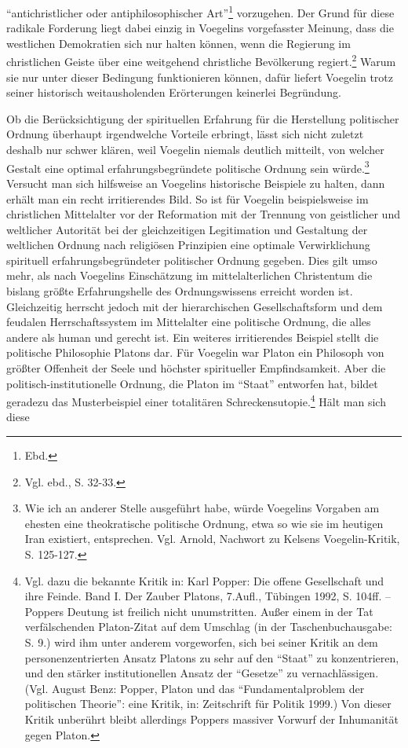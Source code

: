 "`antichristlicher oder antiphilosophischer Art"'\footnote{Ebd.} vorzugehen.
Der Grund für diese radikale Forderung liegt dabei einzig in Voegelins
vorgefasster Meinung, dass die westlichen Demokratien sich nur halten können,
wenn die Regierung im christlichen Geiste über eine weitgehend christliche
Bevölkerung regiert.\footnote{Vgl. ebd., S.  32-33.}  Warum sie nur unter
dieser Bedingung funktionieren können, dafür liefert Voegelin trotz seiner
historisch weitausholenden Erörterungen keinerlei Begründung.

Ob die Berücksichtigung der spirituellen Erfahrung für die Herstellung
politischer Ordnung überhaupt irgendwelche Vorteile erbringt, lässt sich nicht
zuletzt deshalb nur schwer klären, weil Voegelin niemals deutlich mitteilt,
von welcher Gestalt eine optimal erfahrungsbegründete politische Ordnung sein
würde.\footnote{Wie ich an anderer Stelle ausgeführt habe, würde Voegelins
  Vorgaben am ehesten eine theokratische politische Ordnung, etwa so wie sie
  im heutigen Iran existiert, entsprechen. Vgl. Arnold, Nachwort zu Kelsens
  Voegelin-Kritik, S. 125-127.}  Versucht man sich hilfsweise an Voegelins
historische Beispiele zu halten, dann erhält man ein recht irritierendes Bild.
So ist für Voegelin beispielsweise im christlichen Mittelalter vor der
Reformation mit der Trennung von geistlicher und weltlicher Autorität bei der
gleichzeitigen Legitimation und Gestaltung der weltlichen Ordnung nach
religiösen Prinzipien eine optimale Verwirklichung spirituell
erfahrungsbegründeter politischer Ordnung gegeben. Dies gilt umso mehr, als
nach Voegelins Einschätzung im mittelalterlichen Christentum die bislang
größte Erfahrungshelle des Ordnungswissens erreicht worden ist.  Gleichzeitig
herrscht jedoch mit der hierarchischen Gesellschaftsform und dem feudalen
Herrschaftssystem im Mittelalter eine politische Ordnung, die alles andere als
human und gerecht ist. Ein weiteres irritierendes Beispiel stellt die
politische Philosophie Platons dar. Für Voegelin war Platon ein Philosoph von
größter Offenheit der Seele und höchster spiritueller Empfindsamkeit. Aber die
politisch-institutionelle Ordnung, die Platon im "`Staat"' entworfen hat,
bildet geradezu das Musterbeispiel einer totalitären
Schreckensutopie.\footnote{Vgl. dazu die bekannte Kritik in: Karl Popper: Die
  offene Gesellschaft und ihre Feinde. Band I. Der Zauber Platons, 7.Aufl.,
  Tübingen 1992, S. 104ff. -- Poppers Deutung ist freilich nicht unumstritten.
  Außer einem in der Tat verfälschenden Platon-Zitat auf dem Umschlag (in der
  Taschenbuchausgabe: S. 9.) wird ihm unter anderem vorgeworfen, sich bei
  seiner Kritik an dem personenzentrierten Ansatz Platons zu sehr auf den
  "`Staat"' zu konzentrieren, und den stärker institutionellen Ansatz der
  "`Gesetze"' zu vernachlässigen. (Vgl. August Benz: Popper, Platon und das
  "`Fundamentalproblem der politischen Theorie"': eine Kritik, in: Zeitschrift
  für Politik 1999.) Von dieser Kritik unberührt bleibt allerdings Poppers
  massiver Vorwurf der Inhumanität gegen Platon.}  Hält man sich diese
